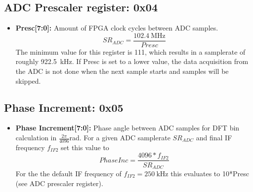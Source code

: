 \documentclass{article}
\newcommand{\bitrect}[2]{
  \begin{pgfonlayer}{foreground}
    \draw [thick] (0,0) rectangle (#1,1);
    \pgfmathsetmacro\result{#1-1}
    \foreach \x in {1,...,\result}
      \draw [thick] (\x,1) -- (\x, 0.8);
  \end{pgfonlayer}
  \bitlabels{#1}{#2}
}
\newcommand{\rwbits}[3]{
  \draw [thick] (#1,0) rectangle ++(#2,1) node[pos=0.5]{#3};
  \pgfmathsetmacro\start{#1+0.5}
  \pgfmathsetmacro\finish{#1+#2-0.5}
}
\newcommand{\robits}[3]{
  \begin{pgfonlayer}{background}
    \draw [thick, fill=lightgray] (#1,0) rectangle ++(#2,1) node[pos=0.5]{#3};
  \end{pgfonlayer}
  \pgfmathsetmacro\start{#1+0.5}
  \pgfmathsetmacro\finish{#1+#2-0.5}
}
\newcommand{\bitlabels}[2]{
  \foreach \bit in {1,...,#1}{
     \pgfmathsetmacro\result{#2}
     \node [above] at (\bit-0.5, 1) {\pgfmathprintnumber{\result}};
   }
}
\begin{document}
\subsection{ADC Prescaler register: 0x04}
\begin{center}
\end{center}
\begin{itemize}
\item \textbf{Presc[7:0]:} Amount of FPGA clock cycles between ADC samples.
$$ SR_{ADC} = \frac{\SI{102.4}{\mega\hertz}}{Presc} $$
The minimum value for this register is 111, which results in a samplerate of roughly \SI{922.5}{\kilo\hertz}. If Presc is set to a lower value, the data acquisition from the ADC is not done when the next sample starts and samples will be skipped.
\end{itemize}

\subsection{Phase Increment: 0x05}
\begin{center}
\end{center}
\begin{itemize}
\item \textbf{Phase Increment[7:0]:} Phase angle between ADC samples for DFT bin calculation in $\frac{2\pi}{4096}$rad.
For a given ADC samplerate $SR_{ADC}$ and final IF frequency $f_{IF2}$ set this value to
$$ PhaseInc = \frac{4096 * f_{IF2}}{SR_{ADC}} $$
For the the default IF frequency of $f_{IF2} = \SI{250}{\kilo\hertz}$ this evaluates to 10*Presc (see ADC prescaler register).
\end{itemize}
\end{document}
